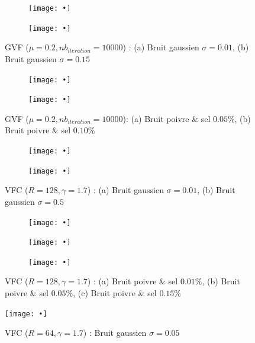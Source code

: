 \begin{figure}[H]
\begin{subfigure}[c]{.5\textwidth}
\centering
\texttt{[image: •]}
\caption{}
\end{subfigure}
\begin{subfigure}[c]{.5\textwidth}
\centering
\texttt{[image: •]}
\caption{}
\end{subfigure}
\caption{GVF ($\mu = 0.2, nb_{iteration} = 10000$) : (a) Bruit gaussien $\sigma = 0.01$, (b) Bruit gaussien $\sigma = 0.15$}
\end{figure}


\begin{figure}[H]
\begin{subfigure}[c]{.5\textwidth}
\centering
\texttt{[image: •]}
\caption{}
\end{subfigure}
\begin{subfigure}[c]{.5\textwidth}
\centering
\texttt{[image: •]}
\caption{}
\end{subfigure}
\caption{GVF ($\mu = 0.2, nb_{iteration} = 10000$): (a) Bruit poivre \& sel $0.05\%$, (b) Bruit poivre \& sel $0.10\%$}
\end{figure}


\begin{figure}[H]
\begin{subfigure}[c]{.5\textwidth}
\centering
\texttt{[image: •]}
\caption{}
\end{subfigure}
\begin{subfigure}[c]{.5\textwidth}
\centering
\texttt{[image: •]}
\caption{}
\end{subfigure}
\caption{VFC ($R = 128, \gamma = 1.7$) : (a) Bruit gaussien $\sigma = 0.01$, (b) Bruit gaussien $\sigma = 0.5$}
\end{figure}


\begin{figure}[H]
\begin{subfigure}[c]{.33\textwidth}
\centering
\texttt{[image: •]}
\caption{}
\end{subfigure}
\begin{subfigure}[c]{.33\textwidth}
\centering
\texttt{[image: •]}
\caption{}
\end{subfigure}
\begin{subfigure}[c]{.33\textwidth}
\centering
\texttt{[image: •]}
\caption{}
\end{subfigure}



\caption{VFC ($R = 128, \gamma = 1.7$) : (a) Bruit poivre \& sel $0.01\%$, (b) Bruit poivre \& sel $0.05\%$, (c) Bruit poivre \& sel $0.15\%$}
\end{figure}

\begin{figure}[H]
\centering
\texttt{[image: •]}
\caption{VFC ($R = 64, \gamma = 1.7$) : Bruit gaussien $\sigma = 0.05$  }
\end{figure}
